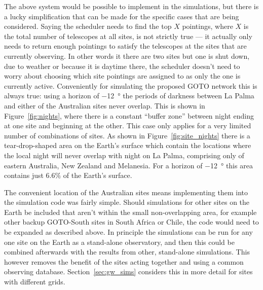 \begin{colsection}
\begin{colsection}
The above system would be possible to implement in the simulations, but there is a lucky simplification that can be made for the specific cases that are being considered. Saying the scheduler needs to find the top $X$ pointings, where $X$ is the total number of telescopes at all sites, is not strictly true --- it actually only needs to return enough pointings to satisfy the telescopes at the sites that are currently observing. In other words it there are two sites but one is shut down, due to weather or because it is daytime there, the scheduler doesn't need to worry about choosing which site pointings are assigned to as only the one is currently active. Conveniently for simulating the proposed GOTO network this is always true: using a horizon of \SI{-12}{\degree} the periods of darkness between La Palma and either of the Australian sites never overlap. This is shown in Figure~\ref{fig:nights}, where there is a constant ``buffer zone'' between night ending at one site and beginning at the other. This case only applies for a very limited number of combinations of sites. As shown in Figure~\ref{fig:site_nights} there is a tear-drop-shaped area on the Earth's surface which contain the locations where the local night will never overlap with night on La Palma, comprising only of eastern Australia, New Zealand and Melanesia. For a horizon of \SI{-12}{\degree} this area contains just $6.6 \%$ of the Earth's surface.

The convenient location of the Australian sites means implementing them into the simulation code was fairly simple. Should simulations for other sites on the Earth be included that aren't within the small non-overlapping area, for example other backup GOTO-South sites in South Africa or Chile, the code would need to be expanded as described above. In principle the simulations can be run for any one site on the Earth as a stand-alone observatory, and then this could be combined afterwards with the results from other, stand-alone simulations. This however removes the benefit of the sites acting together and using a common observing database. Section~\ref{sec:gw_sims} considers this in more detail for sites with different grids.


\end{colsection}
\end{colsection}
